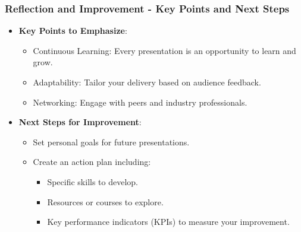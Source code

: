 \documentclass[aspectratio=169]{beamer}
\begin{document}
\begin{frame}[fragile]
    \frametitle{Reflection and Improvement - Key Points and Next Steps}
    \begin{itemize}
        \item \textbf{Key Points to Emphasize}:
        \begin{itemize}
            \item Continuous Learning: Every presentation is an opportunity to learn and grow.
            \item Adaptability: Tailor your delivery based on audience feedback.
            \item Networking: Engage with peers and industry professionals.
        \end{itemize}
        
        \item \textbf{Next Steps for Improvement}:
        \begin{itemize}
            \item Set personal goals for future presentations.
            \item Create an action plan including:
                \begin{itemize}
                    \item Specific skills to develop.
                    \item Resources or courses to explore.
                    \item Key performance indicators (KPIs) to measure your improvement.
                \end{itemize}
        \end{itemize}
    \end{itemize}
\end{frame}
\end{document}
